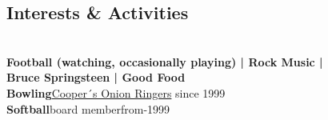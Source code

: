 \documentclass[]{friggeri-cv_reccius-experiment}
\begin{document}
\begin{below2}
  \section{Interests \& Activities}
    \\\vspace{1.7mm}
    \textbf{Football (watching, occasionally playing) | Rock Music |\\
    \belowspace
    Bruce Springsteen | Good Food} \\
    \belowspace
    \textbf{Bowling}\hfill\href{https://kingofqueens.fandom.com/wiki/Doug_Heffernan}{\small Cooper´s Onion Ringers} since 1999\\
    \belowspace
    \textbf{Softball}\hfill\href{https://kingofqueens.fandom.com/wiki/Doug_Heffernan}{\faMousePointer}\thinspace \thinspace board member\thinspace from-1999\\

~
\end{below2}
\newcommand{\eduspace}{\vspace*{0.85mm}}
\newcommand{\eduspaceII}{\vspace*{0.8mm}}
\newcommand{\jobspace}{\vspace*{-4.2mm}}
\vspace{-0.5mm}
\end{document}
